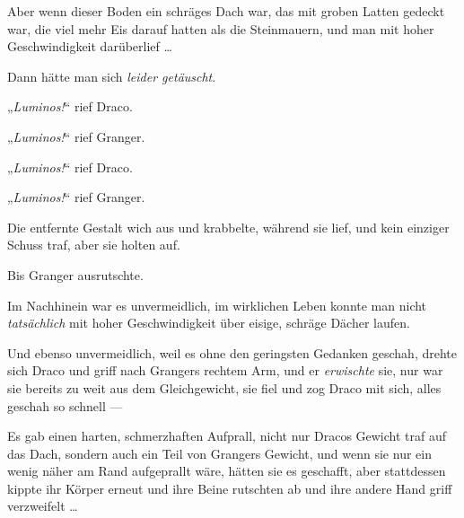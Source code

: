 Aber wenn dieser Boden ein schräges Dach war, das mit groben Latten gedeckt war, die viel mehr Eis darauf hatten als die Steinmauern, und man mit hoher Geschwindigkeit darüberlief …

Dann hätte man sich \emph{leider getäuscht}.

„\emph{Luminos!}“ rief Draco.

„\emph{Luminos!}“ rief Granger.

„\emph{Luminos!}“ rief Draco.

„\emph{Luminos!}“ rief Granger.

Die entfernte Gestalt wich aus und krabbelte, während sie lief, und kein einziger Schuss traf, aber sie holten auf.

Bis Granger ausrutschte.

Im Nachhinein war es unvermeidlich, im wirklichen Leben konnte man nicht \emph{tatsächlich} mit hoher Geschwindigkeit über eisige, schräge Dächer laufen.

Und ebenso unvermeidlich, weil es ohne den geringsten Gedanken geschah, drehte sich Draco und griff nach Grangers rechtem Arm, und er \emph{erwischte} sie, nur war sie bereits zu weit aus dem Gleichgewicht, sie fiel und zog Draco mit sich, alles geschah so schnell —

Es gab einen harten, schmerzhaften Aufprall, nicht nur Dracos Gewicht traf auf das Dach, sondern auch ein Teil von Grangers Gewicht, und wenn sie nur ein wenig näher am Rand aufgeprallt wäre, hätten sie es geschafft, aber stattdessen kippte ihr Körper erneut und ihre Beine rutschten ab und ihre andere Hand griff verzweifelt …

